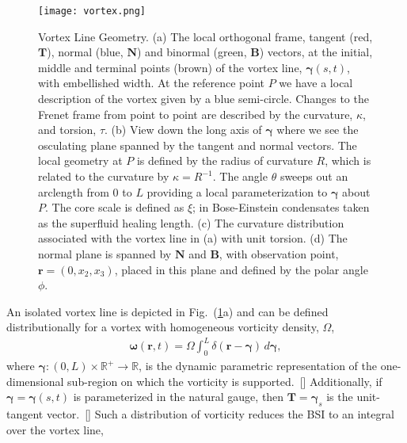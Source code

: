 \documentclass[aps,graphicx,reprint,onecolumn,12pt,tightenlines,longbibliography]{revtex4-1}
\newcommand{\sas}[2]{{#2}}
\begin{document}
%
\begin{figure}[h]
\texttt{[image: vortex.png]}
\caption{Vortex Line Geometry. (a) The local orthogonal frame, tangent (red, $\textbf{T}$), normal (blue, $\textbf{N}$) and binormal (green, $\textbf{B}$) vectors, at the initial, middle and terminal points (brown) of the vortex line, $\bm{\gamma}(s,t)$, with embellished width. At the reference point $P$ we have a local description of the vortex given by a blue semi-circle. Changes to the Frenet frame from point to point are described by the curvature, $\kappa$, and torsion, $\tau$. (b) View\sas{ing}{} down the long axis of $\bm{\gamma}$ where we see the osculating plane spanned by the tangent and normal vectors. The local geometry at $P$ is defined by the radius of curvature $R$, which is related to the curvature by $\kappa=R^{-1}$. The angle $\theta$ sweeps out an arclength from $0$ to $L$ providing a local parameterization to $\bm{\gamma}$ about $P$. The core scale is defined as $\xi$\sas{.}{; in Bose-Einstein condensates taken as the superfluid healing length.} (c) The curvature distribution associated with the vortex line in (a) with unit torsion.  (d) The normal plane is spanned by $\textbf{N}$ and $\textbf{B}$\sas{. An}{, with} observation point, $\textbf{r}=(0,x_{2},x_{3})$, placed in this plane and defined by the polar angle $\phi$.
}
\label{fig:vortex}
\end{figure}
An isolated vortex line is depicted in Fig.~(\ref{fig:vortex}a) and can be defined distributionally for a vortex with homogeneous vorticity density, $\Omega$,
%
\begin{align}\label{eqn:vortex}
 \bm{\omega}(\textbf{r},t) = \Omega \int_{0}^{L} \delta(\textbf{r}-\bm{\gamma}) \, d\bm{\gamma}, 
\end{align}
%
where $\bm{\gamma}: (0,L) \times \mathbb{R}^{+} \to \mathbb{R}$, is the dynamic parametric representation of the one-dimensional sub-region on which the vorticity is supported.~[{}] Additionally, if $\bm{\gamma}=\bm{\gamma}(s,t)$ is parameterized in the natural gauge, then ${\textbf{T}}= \bm{\gamma}_{s}$ is the unit-tangent vector.~[]  Such a distribution of vorticity reduces the BSI to an integral over the vortex line, 
\end{document}
